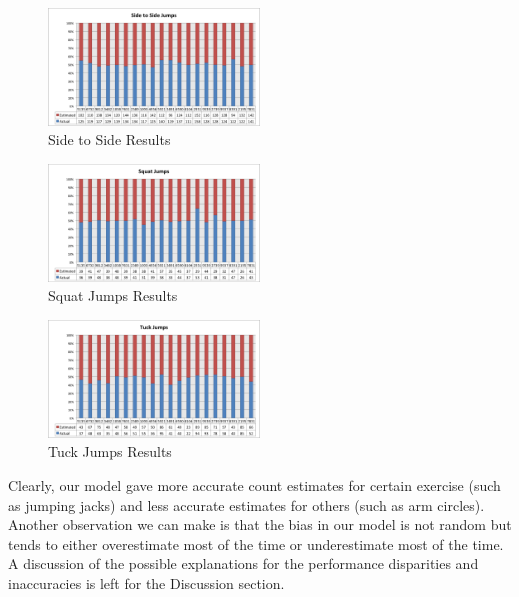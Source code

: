 \begin{figure} [htp]
	\includegraphics[width=0.5\textwidth]{images/sidetoside}
\caption{Side to Side Results}
\end{figure}
\begin{figure} [htp]
	\includegraphics[width=0.5\textwidth]{images/squatjumps}
\caption{Squat Jumps Results}
\end{figure}
\begin{figure} [h!]
	\includegraphics[width=0.5\textwidth]{images/tuckjumps}
\caption{Tuck Jumps Results}
\end{figure} 
Clearly, our model gave more accurate count estimates for certain exercise (such as jumping jacks) and less accurate estimates for others (such as arm circles). Another observation we can make is that the bias in our model is not random but tends to either overestimate most of the time or underestimate most of the time. A discussion of the possible explanations for the performance disparities and inaccuracies is left for the Discussion section. \\